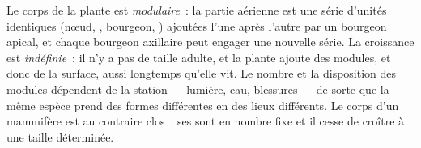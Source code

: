 \begin{proposition}\label{prop:b1:flowering-plant-organization:modular}
Le corps de la plante est \emph{modulaire}~:
la partie aérienne est une série d'unités identiques (nœud, ,
bourgeon, ) ajoutées l'une après l'autre par un bourgeon
apical, et chaque bourgeon axillaire peut engager une nouvelle série. La
croissance est \emph{indéfinie}~: il n'y a
pas de taille adulte, et la plante ajoute des modules, et donc de la
surface, aussi longtemps qu'elle vit. Le nombre et la disposition des
modules dépendent de la station --- lumière, eau, blessures --- de sorte
que la même espèce prend des formes différentes en des lieux différents.
Le corps d'un mammifère est au contraire clos~: ses  sont en
nombre fixe et il cesse de croître à une taille déterminée.
\end{proposition}

